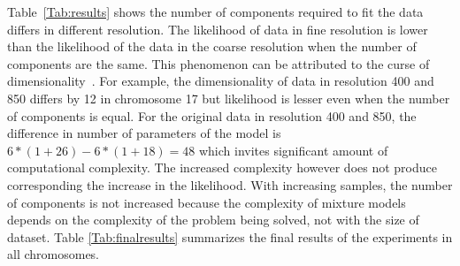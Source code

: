 Table~\ref{Tab:results} shows the number of components required to fit the data differs in different resolution. The likelihood of data in fine resolution is lower than the likelihood of the data in the coarse resolution when the number of components are the same. This phenomenon can be attributed to the curse of dimensionality~\cite{curse}. For example, the dimensionality of data in resolution 400 and 850 differs by 12 in chromosome 17 but likelihood is lesser even when the number of components is equal. For the original data in resolution 400 and 850, the difference in number of parameters of the model is ${6*(1+26)}-{6*(1+18)}=48$ which invites significant amount of computational complexity. The increased complexity however does not produce corresponding the increase in the likelihood. With increasing samples, the number of components is not increased because the complexity of mixture models depends on the complexity of the problem being solved, not with the size of dataset. Table \ref{Tab:finalresults} summarizes the final results of the experiments in all chromosomes. 



